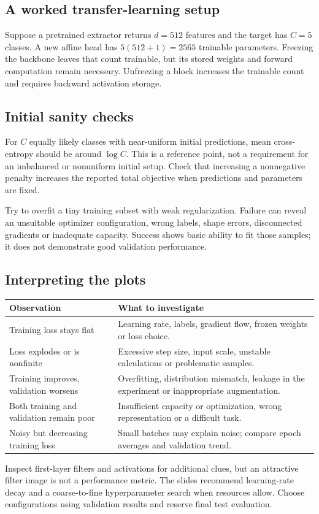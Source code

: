 \documentclass[11pt]{article}
\begin{document}
\subsection{A worked transfer-learning setup}
Suppose a pretrained extractor returns $d=512$ features and the target has $C=5$ classes. A new affine head has $5(512+1)=2565$ trainable parameters. Freezing the backbone leaves that count trainable, but its stored weights and forward computation remain necessary. Unfreezing a block increases the trainable count and requires backward activation storage.
\subsection{Initial sanity checks}
For $C$ equally likely classes with near-uniform initial predictions, mean cross-entropy should be around $\log C$. This is a reference point, not a requirement for an imbalanced or nonuniform initial setup. Check that increasing a nonnegative penalty increases the reported total objective when predictions and parameters are fixed.

Try to overfit a tiny training subset with weak regularization. Failure can reveal an unsuitable optimizer configuration, wrong labels, shape errors, disconnected gradients or inadequate capacity. Success shows basic ability to fit those samples; it does not demonstrate good validation performance.
\subsection{Interpreting the plots}
\begin{longtable}{@{}P{.32\textwidth}P{.59\textwidth}@{}}
\toprule Observation & What to investigate\\\midrule\endhead
Training loss stays flat & Learning rate, labels, gradient flow, frozen weights or loss choice.\\
Loss explodes or is nonfinite & Excessive step size, input scale, unstable calculations or problematic samples.\\
Training improves, validation worsens & Overfitting, distribution mismatch, leakage in the experiment or inappropriate augmentation.\\
Both training and validation remain poor & Insufficient capacity or optimization, wrong representation or a difficult task.\\
Noisy but decreasing training loss & Small batches may explain noise; compare epoch averages and validation trend.\\\bottomrule
\end{longtable}
Inspect first-layer filters and activations for additional clues, but an attractive filter image is not a performance metric. The slides recommend learning-rate decay and a coarse-to-fine hyperparameter search when resources allow. Choose configurations using validation results and reserve final test evaluation.
\end{document}

